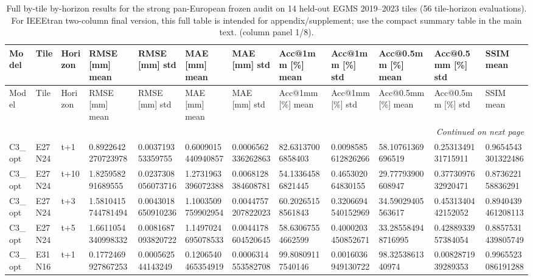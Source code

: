 \begin{landscape}
\scriptsize
\setlength{\LTleft}{0pt}
\setlength{\LTright}{0pt}
\begin{longtable}{llllllllllll}
\caption{Full by-tile by-horizon results for the strong pan-European frozen audit on 14 held-out EGMS 2019--2023 tiles (56 tile-horizon evaluations). For IEEEtran two-column final version, this full table is intended for appendix/supplement; use the compact summary table in the main text. (column panel 1/8).}\label{tab:e7_strong_by_tile_full}\\
\toprule
Model & Tile & Horizon & RMSE [mm] mean & RMSE [mm] std & MAE [mm] mean & MAE [mm] std & Acc@1mm [\%] mean & Acc@1mm [\%] std & Acc@0.5mm [\%] mean & Acc@0.5mm [\%] std & SSIM mean \\
\midrule
\endfirsthead
\toprule
Model & Tile & Horizon & RMSE [mm] mean & RMSE [mm] std & MAE [mm] mean & MAE [mm] std & Acc@1mm [\%] mean & Acc@1mm [\%] std & Acc@0.5mm [\%] mean & Acc@0.5mm [\%] std & SSIM mean \\
\midrule
\endhead
\midrule
\multicolumn{12}{r}{\textit{Continued on next page}} \\
\endfoot
\bottomrule
\endlastfoot
C3\_opt & E27N24 & t+1 & 0.8922642270723978 & 0.003719353359755 & 0.6009015440940857 & 0.0006562336262863 & 82.63137006858403 & 0.0098585612826266 & 58.10761369696519 & 0.2531349131715911 & 0.9654543301322486 \\
C3\_opt & E27N24 & t+10 & 1.825958291689555 & 0.0237308056073716 & 1.2731963396072388 & 0.0068128384608781 & 54.13364586821445 & 0.465302064830155 & 29.77793900608947 & 0.3773097632920471 & 0.873622158836291 \\
C3\_opt & E27N24 & t+3 & 1.5810415744781494 & 0.0043018650910236 & 1.1003509759902954 & 0.0044757207822023 & 60.20265158561843 & 0.3206694540152969 & 34.59029405563617 & 0.4531340442152052 & 0.8940439461208113 \\
C3\_opt & E27N24 & t+5 & 1.6611054340998332 & 0.0081687093820722 & 1.1497024695078533 & 0.0044178604520645 & 58.63067554662599 & 0.4000203450852671 & 33.285584948716995 & 0.4288933957384054 & 0.8857531439805749 \\
C3\_opt & E31N16 & t+1 & 0.1772469927867253 & 0.000562544143249 & 0.1206540465354919 & 0.0006314553582708 & 99.80809117540146 & 0.0016036949130722 & 98.3253861340974 & 0.0082871939289353 & 0.9965523086191288 \\

\end{longtable}
\end{landscape}
